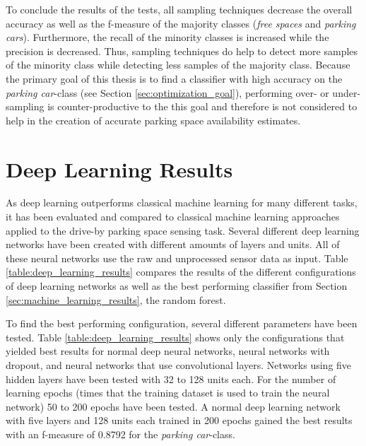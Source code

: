 To conclude the results of the tests, all sampling techniques decrease the overall accuracy as well as the f-measure of the majority classes (\emph{free spaces} and \emph{parking cars}). Furthermore, the recall of the minority classes is increased while the precision is decreased. Thus, sampling techniques do help to detect more samples of the minority class while detecting less samples of the majority class. Because the primary goal of this thesis is to find a classifier with high accuracy on the \emph{parking car}-class (see Section \ref{sec:optimization_goal}), performing over- or under-sampling is counter-productive to the this goal and therefore is not considered to help in the creation of accurate parking space availability estimates.







\section{Deep Learning Results}
\label{sec:deep_learning_results}

As deep learning outperforms classical machine learning for many different tasks, it has been evaluated and compared to classical machine learning approaches applied to the drive-by parking space sensing task. Several different deep learning networks have been created with different amounts of layers and units. All of these neural networks use the raw and unprocessed sensor data as input. Table \ref{table:deep_learning_results} compares the results of the different configurations of deep learning networks as well as the best performing classifier from Section \ref{sec:machine_learning_results}, the random forest. 

To find the best performing configuration, several different parameters have been tested. Table \ref{table:deep_learning_results} shows only the configurations that yielded best results for normal deep neural networks, neural networks with dropout, and neural networks that use convolutional layers. Networks using five hidden layers have been tested with 32 to 128 units each. For the number of learning epochs (times that the training dataset is used to train the neural network) 50 to 200 epochs have been tested.
A normal deep learning network with five layers and 128 units each trained in 200 epochs gained the best results with an f-measure of 0.8792 for the \emph{parking car}-class. 

